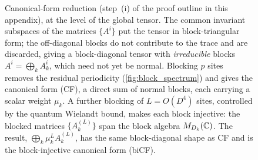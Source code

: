 \begin{figure}[htbp]
\begin{tikzpicture}
    \end{tikzpicture}
    \caption{Canonical-form reduction (step~(i) of the proof outline in this
        appendix), at the level of the global tensor. The common invariant
        subspaces of the matrices $\{A^i\}$ put the tensor in block-triangular
        form; the off-diagonal blocks do not contribute to the trace and are
        discarded, giving a block-diagonal tensor with \emph{irreducible}
        blocks $A^i=\bigoplus_k A_k^i$, which need not yet be normal. Blocking
        $p$ sites removes the residual periodicity
        (\cref{fig:block_spectrum}) and gives the canonical
        form (CF), a direct sum of normal blocks, each carrying a scalar
        weight $\mu_k$. A further blocking of $L=O(D^4)$ sites, controlled by
        the quantum Wielandt bound, makes each block injective: the blocked
        matrices $\{A_k^{(L)}\}$ span the block algebra $M_{D_k}(\mathbb{C})$. The
        result, $\bigoplus_k \mu_k^L A_k^{(L)}$, has the same block-diagonal
        shape as CF and is the block-injective canonical form (biCF).
        }\label{fig:cascade}
\end{figure}

